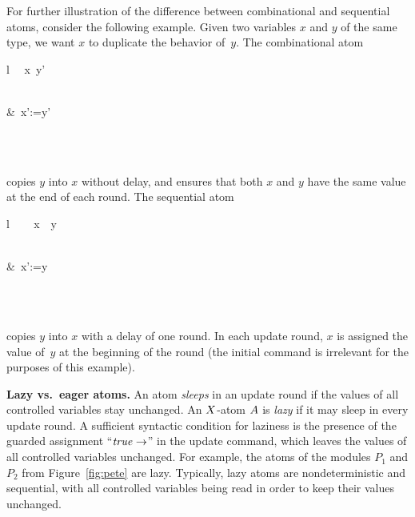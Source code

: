 \mypar
For further illustration of the difference between combinational and
sequential atoms, consider the following example.
Given two variables $x$ and $y$ of the same type, we want $x$ to duplicate
the behavior of~$y$.
The combinational atom
\begin{mtab}{l}
    \qu \ATOM \CCopy~\CONTROLS\ x\ \AWAITS y'\\
    \qqu \INIT \UPDATE\\
    \qqu \begin{chtab}
      \true &\ x':=y'
    \end{chtab}\\
    \qu \ENDA \\
\end{mtab}

copies $y$ into $x$ without delay, and ensures that both $x$ and $y$ have the
same value at the end of each round.
The sequential atom
  \begin{mtab}{l}
    \qu \ATOM\ \SCopy~ \CONTROLS\ x\ \READS\ y\\
    \qqu \UPDATE\\
    \qqu \begin{chtab}
      \true &\ x':=y
    \end{chtab} \\
    \qu \ENDA \\
\end{mtab}
copies $y$ into $x$ with a delay of one round.
In each update round, $x$ is assigned the value of~$y$ at the beginning of
the round
(the initial command is irrelevant for the purposes of this example).

\mypar
{\bf Lazy vs.\ eager atoms.}
An atom {\em sleeps\/} in an update round if the values of all controlled
variables stay unchanged.
An $X$-atom $A$ is {\em lazy\/} if it may sleep in every update
round.
A sufficient syntactic condition for laziness is the presence of the guarded
assignment ``${\it true}\rightarrow$'' in the update command, which leaves the values of
all controlled variables unchanged.
For example, the atoms of the modules $P_1$ and $P_2$ from
Figure~\ref{fig:pete} are lazy.
Typically, lazy atoms are nondeterministic and sequential, with all
controlled variables being read in order to keep their values unchanged.

